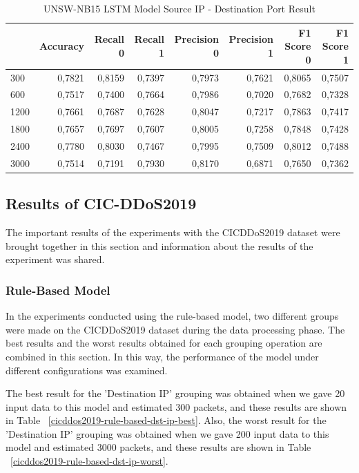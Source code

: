 \documentclass{article}
\begin{document}
\begin{table}
  \centering
  \caption{UNSW-NB15 LSTM Model Source IP - Destination Port Result}
  \label{unswnb15-lstm-src-ip-dst-port-best}
  \begin{tabular}{lrrrrrrr}
    \toprule
	{Pred Win & Accuracy & Recall 0 & Recall 1 & Precision 0 & Precision 1 & F1 Score 0 & F1 Score 1} \\
	\midrule
        300 & 0,7821 & 0,8159 & 0,7397 & 0,7973 & 0,7621 & 0,8065 & 0,7507 \\ \hline
        600 & 0,7517 & 0,7400 & 0,7664 & 0,7986 & 0,7020 & 0,7682 & 0,7328 \\ \hline
        1200 & 0,7661 & 0,7687 & 0,7628 & 0,8047 & 0,7217 & 0,7863 & 0,7417 \\ \hline
        1800 & 0,7657 & 0,7697 & 0,7607 & 0,8005 & 0,7258 & 0,7848 & 0,7428 \\ \hline
        2400 & 0,7780 & 0,8030 & 0,7467 & 0,7995 & 0,7509 & 0,8012 & 0,7488 \\ \hline
        3000 & 0,7514 & 0,7191 & 0,7930 & 0,8170 & 0,6871 & 0,7650 & 0,7362 \\ 
	\bottomrule
  \end{tabular}
\end{table}

\subsection{Results of CIC-DDoS2019}

The important results of the experiments with the CICDDoS2019 dataset were brought together in this section and information about the results of the experiment was shared.

\subsubsection{Rule-Based Model}

In the experiments conducted using the rule-based model, two different groups were made on the CICDDoS2019 dataset during the data processing phase. The best results and the worst results obtained for each grouping operation are combined in this section. In this way, the performance of the model under different configurations was examined.

The best result for the 'Destination IP' grouping was obtained when we gave 20 input data to this model and estimated 300 packets, and these results are shown in Table ~\ref{cicddos2019-rule-based-dst-ip-best}. Also, the worst result for the 'Destination IP' grouping was obtained when we gave 200 input data to this model and estimated 3000 packets, and these results are shown in Table ~\ref{cicddos2019-rule-based-dst-ip-worst}.
\end{document}
